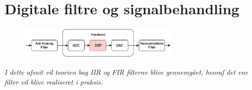 \chapter{Digitale filtre og signalbehandling}\label{kap:filter}

\begin{figure}[h]
	\vspace*{-1 cm}
	\includegraphics[width=8cm]{billeder/flow_dsp}
	\vspace{0.5 cm}
\end{figure}

\emph{I dette afsnit vil teorien bag IIR og FIR filterne blive gennemgået, hvoraf det ene filter vil blive realiseret i praksis.}